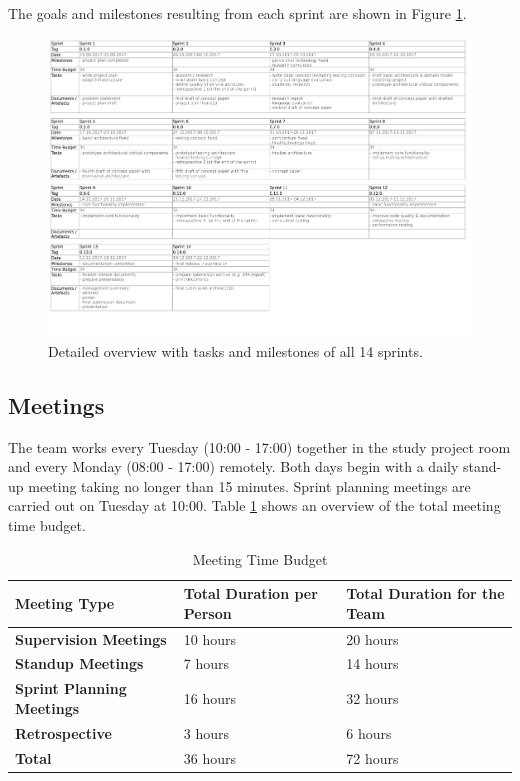 The goals and milestones resulting from each sprint are shown in Figure \ref{fig:sprint-details}.

\begin{figure}[h]
	\begin{sideways}
	\includegraphics[scale=0.75]{resources/sprint_details}
	\end{sideways}
	\centering
	\caption{Detailed overview with tasks and milestones of all 14 sprints.}
	\label{fig:sprint-details}
\end{figure}


\subsection{Meetings}

The team works every Tuesday (10:00 - 17:00) together in the study project room and every Monday (08:00 - 17:00) remotely. Both days begin with a daily stand-up meeting taking no longer than 15 minutes. Sprint planning meetings are carried out on Tuesday at 10:00. Table \ref{meeting-time-budget} shows an overview of the total meeting time budget.

\begin{table}[]
	\centering
	\caption{Meeting Time Budget}
	\label{meeting-time-budget}
	\begin{tabular}{lll}
		\hline
		\textbf{Meeting Type}             & \textbf{Total Duration per Person} & \textbf{Total Duration for the Team} \\ \hline
		\textbf{Supervision Meetings}     & 10 hours                           & 20 hours                             \\
		\textbf{Standup Meetings}         & 7 hours                            & 14 hours                             \\
		\textbf{Sprint Planning Meetings} & 16 hours                           & 32 hours                             \\
		\textbf{Retrospective}            & 3 hours                            & 6 hours                              \\ \hline
		\textbf{Total}                    & 36 hours                           & 72 hours
	\end{tabular}
\end{table}

